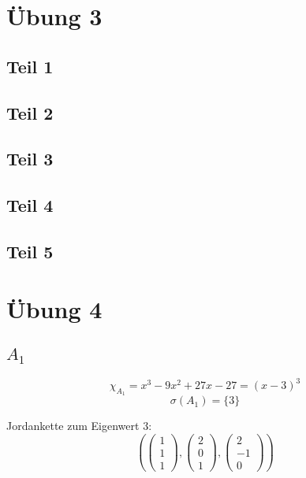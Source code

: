 \documentclass[10pt,a4paper]{article}
\begin{document}
\section*{Übung 3}

\subsection*{Teil 1}



\subsection*{Teil 2}

\subsection*{Teil 3}

\subsection*{Teil 4}

\subsection*{Teil 5}

\section*{Übung 4}

\subsection*{$A_{1}$}

\begin{equation}
\chi_{A_{1}} = x^{3} - 9x^{2} + 27x - 27 = (x - 3)^{3}
\end{equation}
\begin{equation}
\sigma(A_{1}) = \{3\}
\end{equation}

Jordankette zum Eigenwert $3$:
\begin{equation}
\left(
\begin{pmatrix}
1\\1\\1
\end{pmatrix},
\begin{pmatrix}
2\\0\\1
\end{pmatrix},
\begin{pmatrix}
2\\-1\\0
\end{pmatrix}
\right)
\end{equation}
\end{document}
